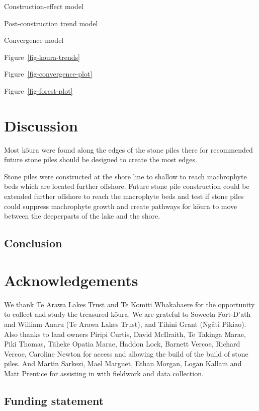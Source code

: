 \documentclass[
  12pt,
  a4paper,
]{scrbook}
\begin{document}
Construction-effect model

Post-construction trend model

Convergence model

Figure~\ref{fig-koura-trends}

Figure~\ref{fig-convergence-plot}

Figure~\ref{fig-forest-plot}


\chapter{Discussion}\label{discussion-3}

Most kōura were found along the edges of the stone piles there for
recommended future stone piles should be designed to create the most
edges.

Stone piles were constructed at the shore line to shallow to reach
machrophyte beds which are located further offshore. Future stone pile
construction could be extended further offshore to reach the macrophyte
beds and test if stone piles could suppress machrophyte growth and
create pathways for kōura to move between the deeperparts of the lake
and the shore.

\section{Conclusion}\label{conclusion-1}


\chapter{Acknowledgements}\label{acknowledgements-3}

We thank Te Arawa Lakes Trust and Te Komiti Whakahaere for the
opportunity to collect and study the treasured kōura. We are grateful to
Soweeta Fort-D'ath and William Anaru (Te Arawa Lakes Trust), and Tihini
Grant (Ngāti Pikiao). Also thanks to land owners Piripi Curtis, David
McIlraith, Te Takinga Marae, Piki Thomas, Tāheke Opatia Marae, Haddon
Lock, Barnett Vercoe, Richard Vercoe, Caroline Newton for access and
allowing the build of the build of stone piles. And Martin Sarkezi, Mael
Marguet, Ethan Morgan, Logan Kallam and Matt Prentice for assisting in
with fieldwork and data collection.

\section{Funding statement}\label{funding-statement-3}
\end{document}
